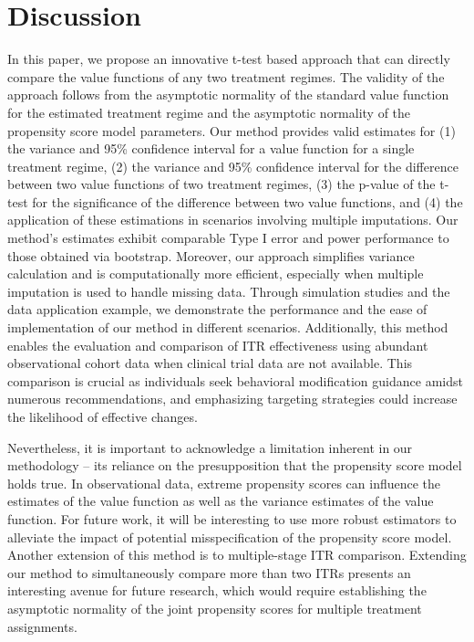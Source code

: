 \documentclass{article}
\begin{document}
\section{Discussion} \label{sec_discussion}
In this paper, we propose an innovative t-test based approach that can directly compare the value functions of any two treatment regimes. The validity of the approach follows from the asymptotic normality of the standard value function for the estimated treatment regime and the asymptotic normality of the propensity score model parameters. Our method provides valid estimates for (1) the variance and 95\% confidence interval for a value function for a single treatment regime, (2) the variance and 95\% confidence interval for the difference between two value functions of two treatment regimes, (3) the p-value of the t-test for the significance of the difference between two value functions, and (4) the application of these estimations in scenarios involving multiple imputations. Our method's estimates exhibit comparable Type I error and power performance to those obtained via bootstrap. Moreover, our approach simplifies variance calculation and is computationally more efficient, especially when multiple imputation is used to handle missing data. Through simulation studies and the data application example, we demonstrate the performance and the ease of implementation of our method in different scenarios. Additionally, this method enables the evaluation and comparison of ITR effectiveness using abundant observational cohort data when clinical trial data are not available. This comparison is crucial as individuals seek behavioral modification guidance amidst numerous recommendations, and emphasizing targeting strategies could increase the likelihood of effective changes.

Nevertheless, it is important to acknowledge a limitation inherent in our methodology – its reliance on the presupposition that the propensity score model holds true. In observational data, extreme propensity scores can influence the estimates of the value function as well as the variance estimates of the value function. For future work, it will be interesting to use more robust estimators to alleviate the impact of potential misspecification of the propensity score model. Another extension of this method is to multiple-stage ITR comparison. Extending our method to simultaneously compare more than two ITRs presents an interesting avenue for future research, which would require establishing the asymptotic normality of the joint propensity scores for multiple treatment assignments. 
\end{document}
